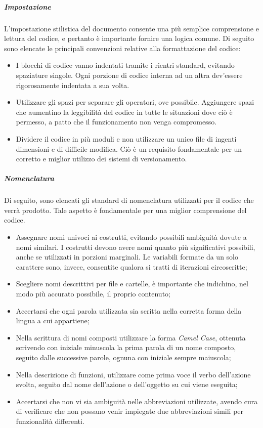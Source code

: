 			\subparagraph{Impostazione}
			L'impostazione stilistica del documento consente una più semplice comprensione e lettura del codice, e pertanto è importante fornire una logica comune. Di seguito sono elencate le principali convenzioni relative alla formattazione del codice: 
			\begin{itemize}
				\item I blocchi di codice vanno indentati tramite i rientri standard, evitando spaziature singole. Ogni porzione di codice interna ad un altra dev'essere rigorosamente indentata a sua volta.
				\item Utilizzare gli spazi per separare gli operatori, ove possibile. Aggiungere spazi che aumentino la leggibilità del codice in tutte le situazioni dove ciò è permesso, a patto che il funzionamento non venga compromesso.
				\item Dividere il codice in più moduli e non utilizzare un unico file di ingenti dimensioni e di difficile modifica. Ciò è un requisito fondamentale per un corretto e miglior utilizzo dei sistemi di versionamento.
			\end{itemize}
	
			\subparagraph{Nomenclatura}
			Di seguito, sono elencati gli standard di nomenclatura utilizzati per il codice che verrà prodotto. Tale aspetto è fondamentale per una miglior comprensione del codice.
			\begin{itemize}
			\item Assegnare nomi univoci ai costrutti, evitando possibili ambiguità dovute a nomi similari. I costrutti devono avere nomi quanto più significativi possibili, anche se utilizzati in porzioni marginali. Le variabili formate da un solo carattere sono, invece, consentite qualora si tratti di iterazioni circoscritte;
			\item Scegliere nomi descrittivi per file e cartelle, è importante che indichino, nel modo più accurato possibile, il proprio contenuto;
			\item Accertarsi che ogni parola utilizzata sia scritta nella corretta forma della lingua a cui appartiene;
			\item Nella scrittura di nomi composti utilizzare la forma \textit{Camel Case}, ottenuta scrivendo con iniziale minuscola la prima parola di un nome composto, seguito dalle successive parole, ognuna con iniziale sempre maiuscola;
			\item Nella descrizione di funzioni, utilizzare come prima voce il verbo dell'azione svolta, seguito dal nome dell'azione o dell'oggetto su cui viene eseguita;
			\item Accertarsi che non vi sia ambiguità nelle abbreviazioni utilizzate, avendo cura di verificare che non possano venir impiegate due abbreviazioni simili per funzionalità differenti.
			\end{itemize}
			

